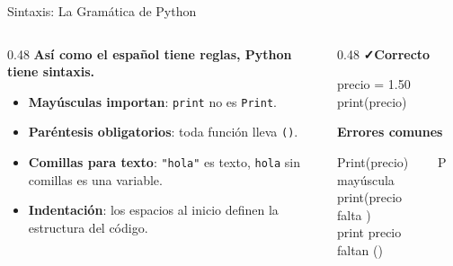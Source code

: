 \documentclass[aspectratio=169, 11pt]{beamer}
\begin{document}
\begin{frame}{Sintaxis: La Gramática de Python}
  \vspace{-6pt}
  \begin{columns}[T]
    \begin{column}{0.48\textwidth}
      {\small\color{arcaDark}\bfseries
        Así como el español tiene reglas,
        Python tiene \textbf{sintaxis}.}

      \vspace{4pt}
      {\footnotesize\color{textMuted}
      \begin{itemize}\setlength{\itemsep}{3pt}
        \item[{\color{arcaRed}\scriptsize\faFont}]
          \textbf{Mayúsculas importan}: \texttt{print} no es \texttt{Print}.

        \item[{\color{arcaRed}\scriptsize\faCode}]
          \textbf{Paréntesis obligatorios}: toda función
          lleva \texttt{()}.

        \item[{\color{arcaRed}\scriptsize\faQuoteRight}]
          \textbf{Comillas para texto}: \texttt{"hola"} es texto,
          \texttt{hola} sin comillas es una variable.

        \item[{\color{arcaRed}\scriptsize\faIndent}]
          \textbf{Indentación}: los espacios al inicio
          definen la estructura del código.
      \end{itemize}
      }
    \end{column}

    \begin{column}{0.48\textwidth}
      {\small\color{codeGreen}\bfseries\faCheck\hspace{4pt}Correcto}
      \begin{tcolorbox}[
        colback=arcaGray, colframe=codeGreen, boxrule=0pt, leftrule=3pt,
        arc=2pt, left=5pt, right=5pt, top=3pt, bottom=3pt
      ]
        {\scriptsize\ttfamily\color{textDark}
        precio = 1.50\\
        print(precio)}
      \end{tcolorbox}

      \vspace{3pt}
      {\small\color{arcaRed}\bfseries\faTimes\hspace{4pt}Errores comunes}
      \begin{tcolorbox}[
        colback=arcaGray, colframe=arcaRed, boxrule=0pt, leftrule=3pt,
        arc=2pt, left=5pt, right=5pt, top=2pt, bottom=2pt
      ]
        {\scriptsize\ttfamily\color{textDark}
        Print(precio)~~~~}{\tiny\color{arcaRed} P mayúscula}\\
        {\scriptsize\ttfamily\color{textDark}
        print(precio~~~~~}{\tiny\color{arcaRed} falta )}\\
        {\scriptsize\ttfamily\color{textDark}
        print precio~~~~~}{\tiny\color{arcaRed} faltan ()}
      \end{tcolorbox}


\end{column}
\end{columns}
\end{frame}
\end{document}
